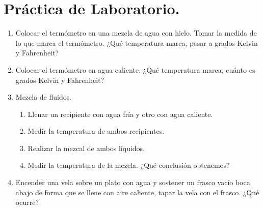 \documentclass[../main]{subfiles}
\begin{document}
\chapter*{Práctica de Laboratorio.}




\begin{enumerate}
\item Colocar el termómetro en una mezcla de agua con hielo. Tomar la medida de lo que marca el termómetro. ¿Qué temperatura marca, pasar a grados Kelvin y Fahrenheit? 
\item Colocar el termómetro en agua caliente. ¿Qué temperatura marca, cuánto es grados Kelvin y Fahrenheit?

\item Mezcla de fluidos.
\begin{enumerate}
    \item Llenar un recipiente con agua fría y otro con agua caliente.
    \item Medir la temperatura de ambos recipientes.
    \item Realizar la mezcal de ambos líquidos.
    \item Medir la temperatura de la mezcla. ¿Qué conclusión obtenemos?
\end{enumerate}

\item Encender una vela sobre un plato con agua y sostener un frasco vacío boca abajo de forma que se llene con aire caliente, tapar la vela con el frasco. ¿Qué ocurre?


  
\end{enumerate}
\end{document}
